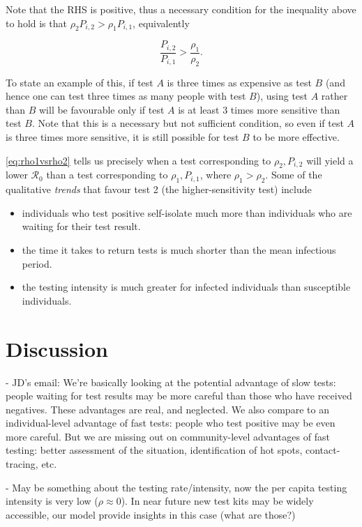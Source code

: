 \documentclass{article}
\newcommand{\Rnum}{\mathcal{R}_0}
\theoremstyle{definition} %
\begin{document}
Note that the RHS is positive, thus a necessary condition for the inequality above to hold is that $\rho_2P_{i,2} > \rho_1P_{i,1}$, equivalently 

\begin{equation}
\frac{P_{i,2}}{P_{i,1}} > \frac{\rho_1}{\rho_2}.
\end{equation}

To state an example of this, if test $A$ is three times as expensive as test $B$ (and hence one can test three times as many people with test $B$), using test $A$ rather than $B$ will be favourable only if test $A$ is at least 3 times more sensitive than test $B$. Note that this is a necessary but not sufficient condition, so even if test $A$ is three times more sensitive, it is still possible for test $B$ to be more effective. 

\cref{eq:rho1vsrho2} tells us precisely when a test corresponding to $\rho_2, P_{i,2}$ will yield a lower $\Rnum$ than a test corresponding to $\rho_1, P_{i,1}$, where $\rho_1 > \rho_2$. Some of the qualitative \textit{trends} that favour test 2 (the higher-sensitivity test) include

\begin{itemize}
    \item individuals who test positive self-isolate much more than individuals who are waiting for their test result.
    \item the time it takes to return tests is much shorter than the mean infectious period.
    \item the testing intensity is much greater for infected individuals than susceptible individuals.
\end{itemize}

\section{Discussion}

- JD's email:
We're basically looking at the potential advantage of slow tests:
people waiting for test results may be more careful than those who
have received negatives. These advantages are real, and neglected. We
also compare to an individual-level advantage of fast tests: people
who test positive may be even more careful. But we are missing out on
community-level advantages of fast testing: better assessment of the
situation, identification of hot spots, contact-tracing, etc. 

- May be something about the testing rate/intensity, now the per capita testing intensity is very low ($\rho \approx 0$). In near future new test kits may be widely accessible, our model provide insights in this case (what are those?)
\end{document}
